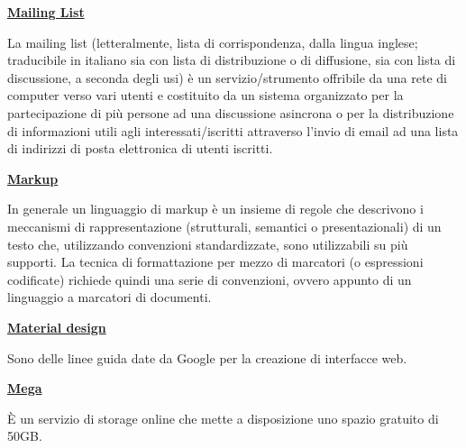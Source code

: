 \bigskip
\begin{addmargin}[0em]{0em}	
	\textbf{\underline{Mailing List}}
\end{addmargin}

\medskip
\begin{addmargin}[5em]{1em}	
La mailing list (letteralmente, lista di corrispondenza, dalla lingua inglese; traducibile in italiano sia con lista di distribuzione o di diffusione, sia con lista di discussione, a seconda degli usi) è un servizio/strumento offribile da una rete di computer verso vari utenti e costituito da un sistema organizzato per la partecipazione di più persone ad una discussione asincrona o per la distribuzione di informazioni utili agli interessati/iscritti attraverso l'invio di email ad una lista di indirizzi di posta elettronica di utenti iscritti.
\end{addmargin}	

\bigskip
\begin{addmargin}[0em]{0em}	
	\textbf{\underline{Markup}} 
\end{addmargin}

\medskip
\begin{addmargin}[5em]{1em}
In generale un linguaggio di markup è un insieme di regole che descrivono i meccanismi di rappresentazione (strutturali, semantici o presentazionali) di un testo che, utilizzando convenzioni standardizzate, sono utilizzabili su più supporti. La tecnica di formattazione per mezzo di marcatori (o espressioni codificate) richiede quindi una serie di convenzioni, ovvero appunto di un linguaggio a marcatori di documenti. 	
\end{addmargin}	

\bigskip
\begin{addmargin}[0em]{0em}	
	\textbf{\underline{Material design}}
\end{addmargin}
	
\medskip
\begin{addmargin}[5em]{1em}
Sono delle linee guida date da Google per la creazione di interfacce web.	
\end{addmargin}	

\bigskip
\begin{addmargin}[0em]{0em}	
	\textbf{\underline{Mega}} 
\end{addmargin}
	
\medskip
\begin{addmargin}[5em]{1em}
È un servizio di storage online che mette a disposizione uno spazio gratuito di 50GB. 
\end{addmargin}	

